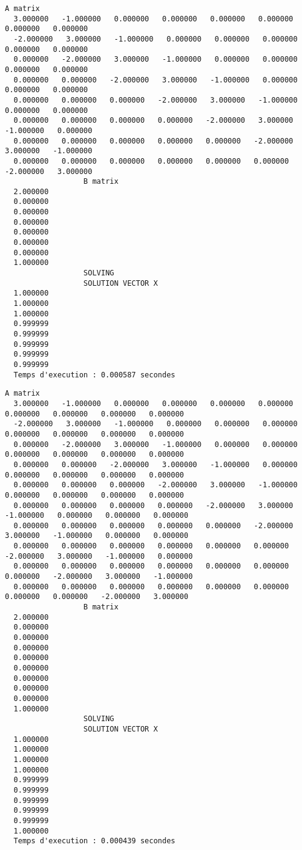 \documentclass{report}
\begin{document}
\begin{lstlisting}[caption={$A_11X=B$} results, basicstyle=\fontsize{5}{8}\selectfont]
                  A matrix
  3.000000   -1.000000   0.000000   0.000000   0.000000   0.000000   0.000000   0.000000   
  -2.000000   3.000000   -1.000000   0.000000   0.000000   0.000000   0.000000   0.000000   
  0.000000   -2.000000   3.000000   -1.000000   0.000000   0.000000   0.000000   0.000000   
  0.000000   0.000000   -2.000000   3.000000   -1.000000   0.000000   0.000000   0.000000   
  0.000000   0.000000   0.000000   -2.000000   3.000000   -1.000000   0.000000   0.000000   
  0.000000   0.000000   0.000000   0.000000   -2.000000   3.000000   -1.000000   0.000000   
  0.000000   0.000000   0.000000   0.000000   0.000000   -2.000000   3.000000   -1.000000   
  0.000000   0.000000   0.000000   0.000000   0.000000   0.000000   -2.000000   3.000000   
                  B matrix
  2.000000   
  0.000000   
  0.000000   
  0.000000   
  0.000000   
  0.000000   
  0.000000   
  1.000000   
                  SOLVING
                  SOLUTION VECTOR X 
  1.000000   
  1.000000   
  1.000000   
  0.999999   
  0.999999   
  0.999999   
  0.999999   
  0.999999   
  Temps d'execution : 0.000587 secondes
\end{lstlisting}
\begin{lstlisting}[caption={$A_12X=B$} results, basicstyle=\fontsize{5}{8}\selectfont]
                  A matrix
  3.000000   -1.000000   0.000000   0.000000   0.000000   0.000000   0.000000   0.000000   0.000000   0.000000   
  -2.000000   3.000000   -1.000000   0.000000   0.000000   0.000000   0.000000   0.000000   0.000000   0.000000   
  0.000000   -2.000000   3.000000   -1.000000   0.000000   0.000000   0.000000   0.000000   0.000000   0.000000   
  0.000000   0.000000   -2.000000   3.000000   -1.000000   0.000000   0.000000   0.000000   0.000000   0.000000   
  0.000000   0.000000   0.000000   -2.000000   3.000000   -1.000000   0.000000   0.000000   0.000000   0.000000   
  0.000000   0.000000   0.000000   0.000000   -2.000000   3.000000   -1.000000   0.000000   0.000000   0.000000   
  0.000000   0.000000   0.000000   0.000000   0.000000   -2.000000   3.000000   -1.000000   0.000000   0.000000   
  0.000000   0.000000   0.000000   0.000000   0.000000   0.000000   -2.000000   3.000000   -1.000000   0.000000   
  0.000000   0.000000   0.000000   0.000000   0.000000   0.000000   0.000000   -2.000000   3.000000   -1.000000   
  0.000000   0.000000   0.000000   0.000000   0.000000   0.000000   0.000000   0.000000   -2.000000   3.000000   
                  B matrix
  2.000000   
  0.000000   
  0.000000   
  0.000000   
  0.000000   
  0.000000   
  0.000000   
  0.000000   
  0.000000   
  1.000000   
                  SOLVING
                  SOLUTION VECTOR X 
  1.000000   
  1.000000   
  1.000000   
  1.000000   
  0.999999   
  0.999999   
  0.999999   
  0.999999   
  0.999999   
  1.000000   
  Temps d'execution : 0.000439 secondes
\end{lstlisting}
\end{document}
